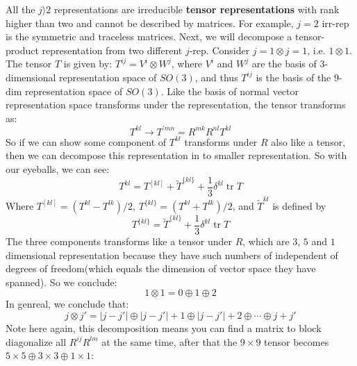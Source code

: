 \documentclass{article}
\begin{document}
	All the $j \rangle 2$ representations are irreducible \textbf{tensor representations} with rank higher than two and cannot be described by matrices. For example, $j=2$ irr-rep is the symmetric and traceless matrices. Next, we will decompose a tensor-product representation from two different $j$-rep. Consider $j=1\otimes j=1$, i.e. $1\otimes 1$. The tensor $T$ is given by: $T^{ij} =V^{i} \otimes W^{j}$, where $V^{i}$ and $W^{j}$ are the basis of 3-dimensional representation space of $SO( 3)$, and thus $T^{ij}$ is the basis of the $9$-dim representation space of $SO( 3)$. Like the basis of normal vector representation space transforms under the representation, the tensor transforms as:
	\begin{equation*}
		T^{kl}\rightarrow T^{\prime mn} =R^{mk} R^{nl} T^{kl}
	\end{equation*}
	So if we can show some component of $T^{kl}$ transforms under $R$ also like a tensor, then we can decompose this representation in to smaller representation. So with our eyeballs, we can see:
	\begin{equation*}
		T^{kl} =T^{[ kl]} +\tilde{T}^{\{kl\}} +\frac{1}{3} \delta ^{kl}\operatorname{tr} T
	\end{equation*}
	Where $T^{[ kl]} =\left( T^{kl} -T^{lk}\right) /2$, $T^{\{kl\}} =\left( T^{kl} +T^{lk}\right) /2$, and $\tilde{T}^{kl}$ is defined by
	\begin{equation*}
		T^{\{kl\}} =\tilde{T}^{\{kl\}} +\frac{1}{3} \delta ^{kl}\operatorname{tr} T
	\end{equation*}
	The three components transforms like a tensor under $R$, which are $3$, $5$ and $1$ dimensional representation because they have such numbers of independent of degrees of freedom(which equals the dimension of vector space they have spanned). So we conclude:
	\begin{equation*}
		1\otimes 1=0\oplus 1\oplus 2
	\end{equation*}
	In genreal, we conclude that:
	\begin{equation*}
		j\otimes j'=| j-j'| \oplus | j-j'| +1\oplus | j-j'| +2\oplus \cdots \oplus j+j'
	\end{equation*}
	Note here again, this decomposition means you can find a matrix to block diagonalize all $R^{ij} R^{lm}$ at the same time, after that the $9\times 9$ tensor becomes $5\times 5\oplus 3\times 3\oplus 1\times 1$:
\end{document}
